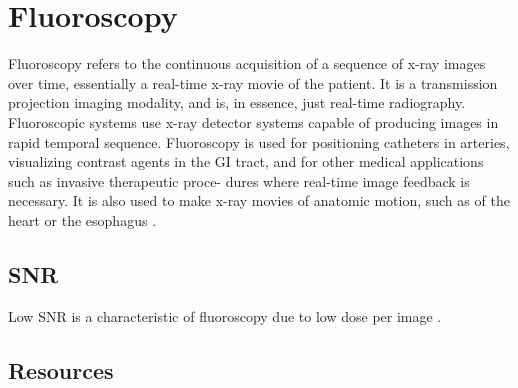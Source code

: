 \chapter{Fluoroscopy}

Fluoroscopy refers to the continuous acquisition of a sequence of x-ray images over
time, essentially a real-time x-ray movie of the patient. It is a transmission projection
imaging modality, and is, in essence, just real-time radiography. Fluoroscopic systems
use x-ray detector systems capable of producing images in rapid temporal sequence.
Fluoroscopy is used for positioning catheters in arteries, visualizing contrast agents
in the GI tract, and for other medical applications such as invasive therapeutic proce-
dures where real-time image feedback is necessary. It is also used to make x-ray movies
of anatomic motion, such as of the heart or the esophagus \cite{bushberg2011essential}.

\section{SNR}
Low SNR is a characteristic of fluoroscopy due to low dose per image
\cite{bushberg2011essential}.

\section{Resources}


